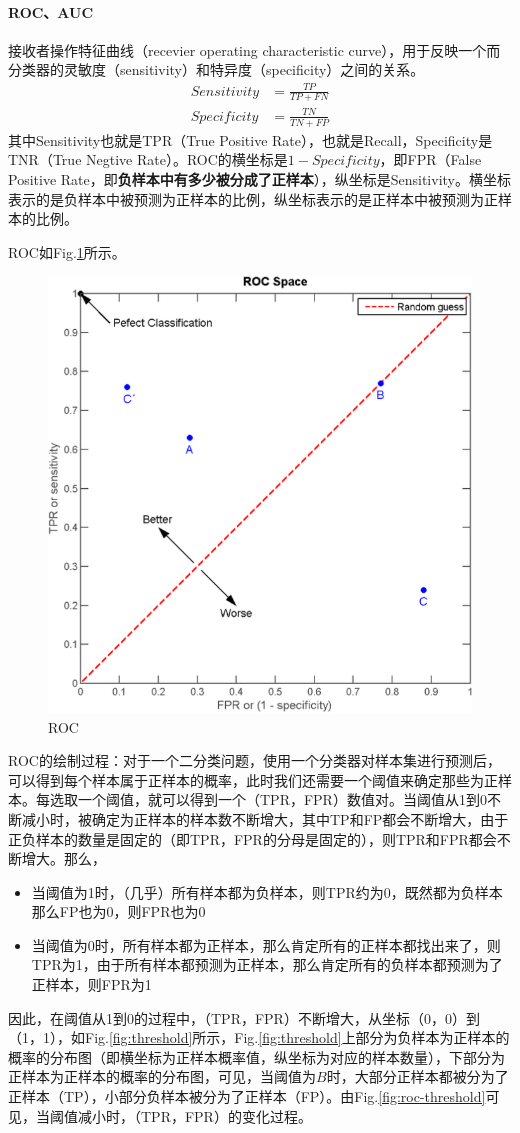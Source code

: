 \paragraph{ROC、AUC}接收者操作特征曲线（recevier operating characteristic curve），用于反映一个而分类器的灵敏度（sensitivity）和特异度（specificity）之间的关系。
$$
\begin{aligned}
	Sensitivity &= \frac{TP}{TP + FN}\\
	Specificity &= \frac{TN}{TN + FP}
\end{aligned}
$$
其中Sensitivity也就是TPR（True Positive Rate），也就是Recall，Specificity是TNR（True Negtive Rate）。ROC的横坐标是$1 - Specificity$，即FPR（False Positive Rate，即\textbf{负样本中有多少被分成了正样本}），纵坐标是Sensitivity。横坐标表示的是负样本中被预测为正样本的比例，纵坐标表示的是正样本中被预测为正样本的比例。

ROC如Fig.\ref{fig:roc}所示。

\begin{figure}[h]
	\centering
	\includegraphics[width=.6\textwidth]{pics/roc.png}
	\caption{ROC}
	\label{fig:roc}
\end{figure}
ROC的绘制过程：对于一个二分类问题，使用一个分类器对样本集进行预测后，可以得到每个样本属于正样本的概率，此时我们还需要一个阈值来确定那些为正样本。每选取一个阈值，就可以得到一个（TPR，FPR）数值对。当阈值从1到0不断减小时，被确定为正样本的样本数不断增大，其中TP和FP都会不断增大，由于正负样本的数量是固定的（即TPR，FPR的分母是固定的），则TPR和FPR都会不断增大。那么，
\begin{itemize}
	\item 当阈值为1时，（几乎）所有样本都为负样本，则TPR约为0，既然都为负样本那么FP也为0，则FPR也为0
	\item 当阈值为0时，所有样本都为正样本，那么肯定所有的正样本都找出来了，则TPR为1，由于所有样本都预测为正样本，那么肯定所有的负样本都预测为了正样本，则FPR为1
\end{itemize}
因此，在阈值从1到0的过程中，（TPR，FPR）不断增大，从坐标（0，0）到（1，1），如Fig.\ref{fig:threshold}所示，Fig.\ref{fig:threshold}上部分为负样本为正样本的概率的分布图（即横坐标为正样本概率值，纵坐标为对应的样本数量），下部分为正样本为正样本的概率的分布图，可见，当阈值为$B$时，大部分正样本都被分为了正样本（TP），小部分负样本被分为了正样本（FP）。由Fig.\ref{fig:roc-threshold}可见，当阈值减小时，（TPR，FPR）的变化过程。

